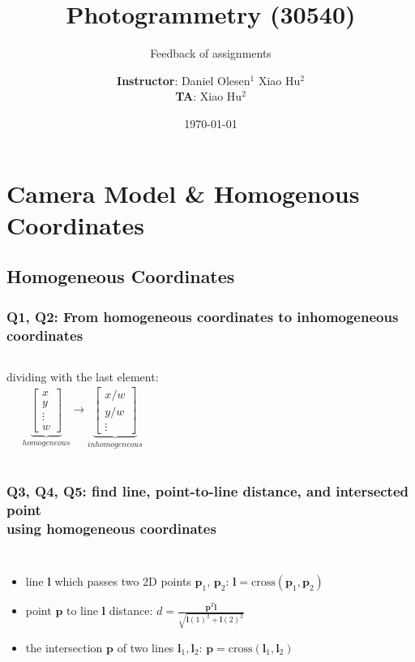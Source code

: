 \documentclass[aspectratio=169, compress]{beamer}
\title{Photogrammetry (30540)}
\subtitle{Feedback of assignments}
\author{\textbf{Instructor}: Daniel Olesen$^1$ Xiao Hu$^2$\\
	\textbf{TA}: Xiao Hu$^2$}
\institute{$^1$: Assistant Professor, Dept. of Geodesy\\ $2$: PhD student}
\date{\today}
\begin{document}
	\frame{
		\maketitle
	}	
	
	\section{Camera Model \& Homogenous Coordinates}
	\subsection{Homogeneous Coordinates}
	\begin{frame}[fragile]
		\frametitle{Q1, Q2: From homogeneous coordinates to inhomogeneous coordinates} 
		\begin{columns}
			dividing with the last element:
			\begin{align*}
			\underbrace{
			\left[
			\begin{matrix}
			x \\ y \\ \vdots \\ w
			\end{matrix}\right]}_{homogeneous} \to \underbrace{
			\left[
			\begin{matrix}
			x/w \\ y/w \\ \vdots
			\end{matrix}\right]}_{inhomogeneous}
			\end{align*}
		 
			\end{columns}
\end{frame}

	\begin{frame}[fragile]
		\frametitle{Q3, Q4, Q5: find line, point-to-line distance, and intersected point \\ using homogeneous coordinates}
		\begin{columns}
			\column[c]{.5\textwidth}		
			\begin{itemize}
			\item line $\mathbf{l}$ which passes two 2D points $\mathbf{p}_1$, $\mathbf{p}_2$: $\mathbf{l}=\text{cross}(\mathbf{p}_1,\mathbf{p}_2)$
			\item point $\mathbf{p}$ to line $\mathbf{l}$ distance: $d=\frac{\mathbf{p}^T\mathbf{l}}{\sqrt{\mathbf{l}(1)^2+\mathbf{l}(2)^2}}$
			\item the intersection $\mathbf{p}$ of two lines $\mathbf{l}_1, \mathbf{l}_2$: $\mathbf{p}=\text{cross}(\mathbf{l}_1,\mathbf{l}_2)$
			\end{itemize}
			\column[c]{.5\textwidth}
		 
			\end{columns}
\end{frame}
\end{document}
